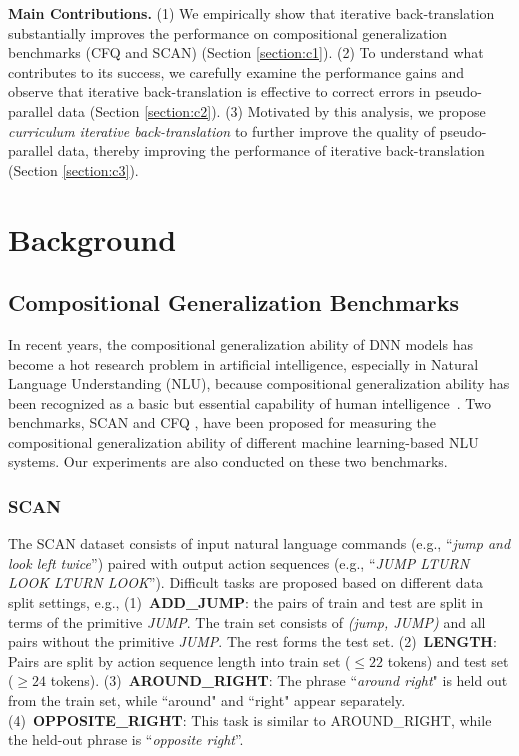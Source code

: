 \documentclass[letterpaper]{article} %
\begin{document}
\textbf{Main Contributions.}
(1) We empirically show that iterative back-translation substantially improves the performance on compositional generalization benchmarks (CFQ and SCAN) (Section \ref{section:c1}).
(2) To understand what contributes to its success, we carefully examine the performance gains and observe that iterative back-translation is effective to correct errors in pseudo-parallel data  (Section \ref{section:c2}).
(3) Motivated by this analysis, we propose \emph{curriculum iterative back-translation} to further improve the quality of pseudo-parallel data, thereby improving the performance of iterative back-translation (Section \ref{section:c3}).

\section{Background}

\subsection{Compositional Generalization Benchmarks}
\label{section:tasks}

In recent years, the compositional generalization ability of DNN models has become a hot research problem in artificial intelligence, especially in Natural Language Understanding (NLU), because compositional generalization ability has been recognized as a basic but essential capability of human intelligence~\cite{lake2017building}.
Two benchmarks, SCAN \cite{lake2018generalization} and CFQ \cite{keysers2020measuring}, have been proposed for measuring the compositional generalization ability of different machine learning-based NLU systems.
Our experiments are also conducted on these two benchmarks.

\subsubsection{SCAN}
The SCAN dataset consists of input natural language commands (e.g., ``\emph{jump and look left twice}'') paired with output action sequences (e.g., ``\emph{JUMP LTURN LOOK LTURN LOOK}'').
Difficult tasks are proposed based on different data split settings, e.g.,
(1)~\textbf{ADD\_JUMP}: the pairs of train and test are split in terms of the primitive \emph{JUMP}.
The train set consists of \emph{(jump, JUMP)} and all pairs without the primitive \emph{JUMP}.
The rest forms the test set.
(2)~\textbf{LENGTH}: Pairs are split by action sequence length into train set ($\leq 22$ tokens) and test set ($\geq 24$ tokens). (3)~\textbf{AROUND\_RIGHT}: The phrase ``\emph{around right}" is held out from the train set, while ``around" and ``right" appear separately.
(4)~\textbf{OPPOSITE\_RIGHT}: This task is similar to AROUND\_RIGHT, while the held-out phrase is ``\emph{opposite right}''.
\end{document}

